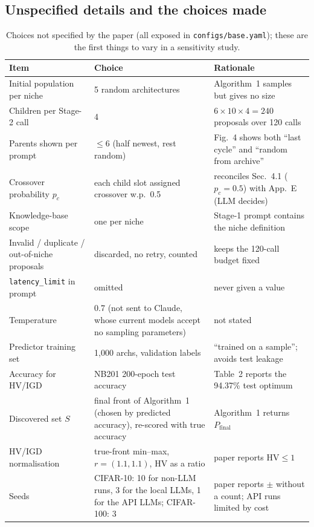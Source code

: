 \documentclass[pdflatex,sn-mathphys-num]{sn-jnl}
\newcommand{\code}[1]{\texttt{#1}}
\newcommand{\HV}{\mathrm{HV}}
\begin{document}
\subsection{Unspecified details and the choices made}\label{sec:assumed}
\begin{table}[h]\centering\footnotesize\setlength{\tabcolsep}{3pt}
\caption{Choices not specified by the paper (all exposed in \code{configs/base.yaml}); these are the first things to vary in a sensitivity study.}\label{tab:assumed}
\begin{tabular}{p{3.6cm}p{3.1cm}p{4.8cm}}
\toprule
Item & Choice & Rationale \\
\midrule
Initial population per niche & 5 random architectures & Algorithm~1 samples but gives no size \\
Children per Stage-2 call & 4 & $6\times10\times4=240$ proposals over 120 calls \\
Parents shown per prompt & $\le6$ (half newest, rest random) & Fig.~4 shows both ``last cycle'' and ``random from archive'' \\
Crossover probability $p_c$ & each child slot assigned crossover w.p.\ 0.5 & reconciles Sec.~4.1 ($p_c{=}0.5$) with App.~E (LLM decides) \\
Knowledge-base scope & one per niche & Stage-1 prompt contains the niche definition \\
Invalid / duplicate / out-of-niche proposals & discarded, no retry, counted & keeps the 120-call budget fixed \\
\code{latency\_limit} in prompt & omitted & never given a value \\
Temperature & 0.7 (not sent to Claude, whose current models accept no sampling parameters) & not stated \\
Predictor training set & 1{,}000 archs, validation labels & ``trained on a sample''; avoids test leakage \\
Accuracy for HV/IGD & NB201 200-epoch test accuracy & Table~2 reports the 94.37\% test optimum \\
Discovered set $S$ & final front of Algorithm~1 (chosen by predicted accuracy), re-scored with true accuracy & Algorithm~1 returns $P_{\text{final}}$ \\
HV/IGD normalisation & true-front min--max, $r=(1.1,1.1)$, HV as a ratio & paper reports $\HV\le1$ \\
Seeds & CIFAR-10: 10 for non-LLM runs, 3 for the local LLMs, 1 for the API LLMs; CIFAR-100: 3 & paper reports $\pm$ without a count; API runs limited by cost \\
\bottomrule
\end{tabular}
\end{table}
\end{document}
